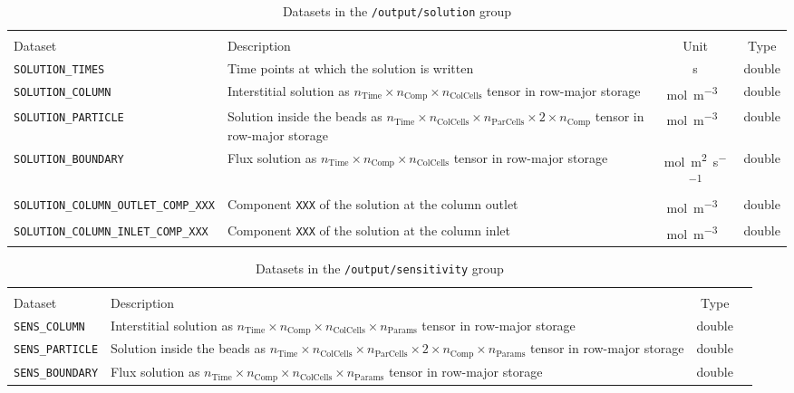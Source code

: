 \begin{table}[!ht]
\footnotesize
\begin{tabu}to \linewidth[m]{lX[m]cc} \toprule
{} \\
\rowfont[c]\normalfont Dataset & Description & Unit & Type \everyrow{\midrule}\\      
\texttt{SOLUTION\_TIMES} & Time points at which the solution is written & \si{\second} & double \\
\texttt{SOLUTION\_COLUMN} & Interstitial solution as $n_{\text{Time}} \times n_{\text{Comp}} \times n_{\text{ColCells}}$ tensor in row-major storage & \si{\mol\per\cubic\metre{}} & double \\
\texttt{SOLUTION\_PARTICLE} & Solution inside the beads as $n_{\text{Time}} \times n_{\text{ColCells}} \times n_{\text{ParCells}} \times 2 \times n_{\text{Comp}}$ tensor in row-major storage & \si{\mol\per\cubic\metre{}} & double \\
\texttt{SOLUTION\_BOUNDARY} & Flux solution as $n_{\text{Time}} \times n_{\text{Comp}} \times n_{\text{ColCells}}$ tensor in row-major storage & \si{\mol\per\square\metre\per\second} & double \\
\texttt{SOLUTION\_COLUMN\_OUTLET\_COMP\_XXX} & Component \texttt{XXX} of the solution at the column outlet & \si{\mol\per\cubic\metre{}} & double \\
\texttt{SOLUTION\_COLUMN\_INLET\_COMP\_XXX} & Component \texttt{XXX} of the solution at the column inlet & \si{\mol\per\cubic\metre{}} & double 
\everyrow{}\\
\bottomrule
\end{tabu}
\caption{\label{tab:FFOutputSolution}Datasets in the \texttt{/output/solution} group}
\end{table}


\begin{table}[!ht]
\footnotesize
\begin{tabu}to \linewidth[m]{lX[m]cc} \toprule
{} \\
\rowfont[c]\normalfont Dataset & Description & Type \everyrow{\midrule}\\      
\texttt{SENS\_COLUMN} & Interstitial solution as $n_{\text{Time}} \times n_{\text{Comp}} \times n_{\text{ColCells}} \times n_{\text{Params}}$ tensor in row-major storage & double \\
\texttt{SENS\_PARTICLE} & Solution inside the beads as $n_{\text{Time}} \times n_{\text{ColCells}} \times n_{\text{ParCells}} \times 2 \times n_{\text{Comp}} \times n_{\text{Params}}$ tensor in row-major storage & double \\
\texttt{SENS\_BOUNDARY} & Flux solution as $n_{\text{Time}} \times n_{\text{Comp}} \times n_{\text{ColCells}} \times n_{\text{Params}}$ tensor in row-major storage & double
\everyrow{}\\
\bottomrule
\end{tabu}
\caption{\label{tab:FFOutputSensitivity}Datasets in the \texttt{/output/sensitivity} group}
\end{table}


